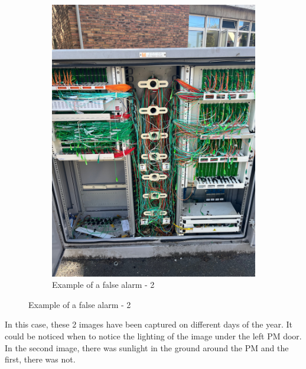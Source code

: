 \begin{figure}[H]
\begin{subfigure}{0.3\textwidth}
        \includegraphics[width=\linewidth]{images/false_positif/5173534_2.jpg}
        \caption{Example of a false alarm - 2}
    \end{subfigure}
\end{figure}

In this case, these 2 images have been captured on different days of the year. It could be noticed when to notice the lighting of the image under the left PM door. In the second image, there was sunlight in the ground around the PM and the first, there was not.

